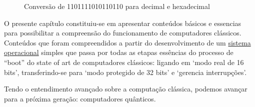 \vspace{1cm}
\begin{figure}[H] \centering 
  \caption{\label{fig:3} Conversão de 1101111010110110 para decimal e hexadecimal} 
\end{figure}

O presente capítulo constituiu-se em apresentar conteúdos básicos e essencias para possibilitar a compreensão do funcionamento de computadores clássicos. Conteúdos que foram compreendidos a partir do desenvolvimento de um \href{https://github.com/gzsig/zsig-OS}{sistema operacional} simples que passa por todas as etapas essências do processo de ``boot'' do state of art de computadores clássicos: ligando em `modo real de 16 bits', transferindo-se para `modo protegido de 32 bits' e `gerencia interrupções'.

Tendo o entendimento avançado sobre a computação clássica, podemos avançar para a próxima geração: computadores quânticos.
\newpage
